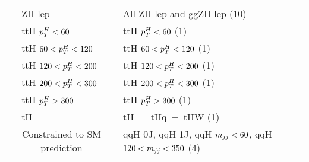 \begin{tabular}{cll}
   & ZH lep & All ZH lep and ggZH lep (10) \\  [\cmsTabSkip]
   & ttH $p_T^H<60$ & ttH $p_T^H<60$ (1) \\ 
   & ttH $60<p_T^H<120$ & ttH $60<p_T^H<120$ (1) \\ 
   & ttH $120<p_T^H<200$ & ttH $120<p_T^H<200$ (1) \\ 
   & ttH $200<p_T^H<300$ & ttH $200<p_T^H<300$ (1) \\ 
   & ttH $p_T^H>300$ & ttH $p_T^H>300$ (1) \\  [\cmsTabSkip]
   & tH & tH~=~tHq~+~tHW (1) \\
  \hline
  \multicolumn{2}{c}{\rule{0pt}{4ex} Constrained to SM prediction} & qqH 0J, qqH 1J, qqH $m_{jj}<60$, qqH $120<m_{jj}<350$ (4) \\
  \hline
\end{tabular}

